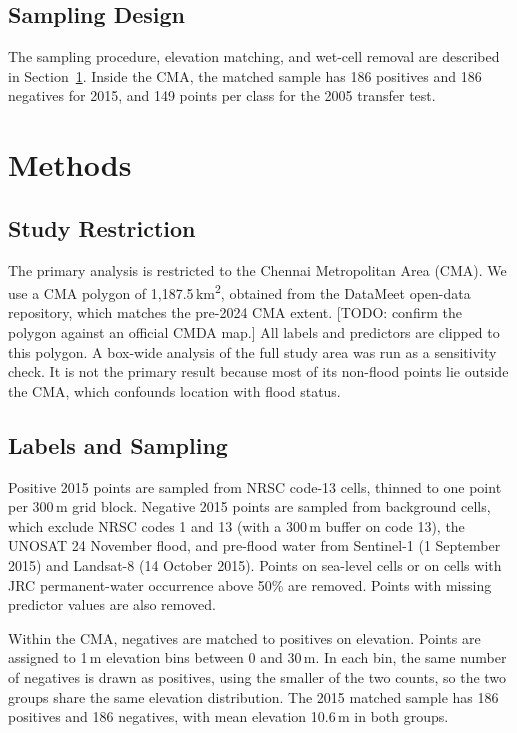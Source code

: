 \documentclass[conference]{IEEEtran}
\begin{document}
\subsection{Sampling Design}
The sampling procedure, elevation matching, and wet-cell removal are described in Section~\ref{sec:methods}. Inside the CMA, the matched sample has 186 positives and 186 negatives for 2015, and 149 points per class for the 2005 transfer test.

\section{Methods}\label{sec:methods}

\subsection{Study Restriction}
The primary analysis is restricted to the Chennai Metropolitan Area (CMA). We use a CMA polygon of 1,187.5\,km\textsuperscript{2}, obtained from the DataMeet open-data repository, which matches the pre-2024 CMA extent. [TODO: confirm the polygon against an official CMDA map.] All labels and predictors are clipped to this polygon. A box-wide analysis of the full study area was run as a sensitivity check. It is not the primary result because most of its non-flood points lie outside the CMA, which confounds location with flood status.

\subsection{Labels and Sampling}
Positive 2015 points are sampled from NRSC code-13 cells, thinned to one point per 300\,m grid block. Negative 2015 points are sampled from background cells, which exclude NRSC codes 1 and 13 (with a 300\,m buffer on code 13), the UNOSAT 24 November flood, and pre-flood water from Sentinel-1 (1 September 2015) and Landsat-8 (14 October 2015). Points on sea-level cells or on cells with JRC permanent-water occurrence above 50\% are removed. Points with missing predictor values are also removed.

Within the CMA, negatives are matched to positives on elevation. Points are assigned to 1\,m elevation bins between 0 and 30\,m. In each bin, the same number of negatives is drawn as positives, using the smaller of the two counts, so the two groups share the same elevation distribution. The 2015 matched sample has 186 positives and 186 negatives, with mean elevation 10.6\,m in both groups.
\end{document}
